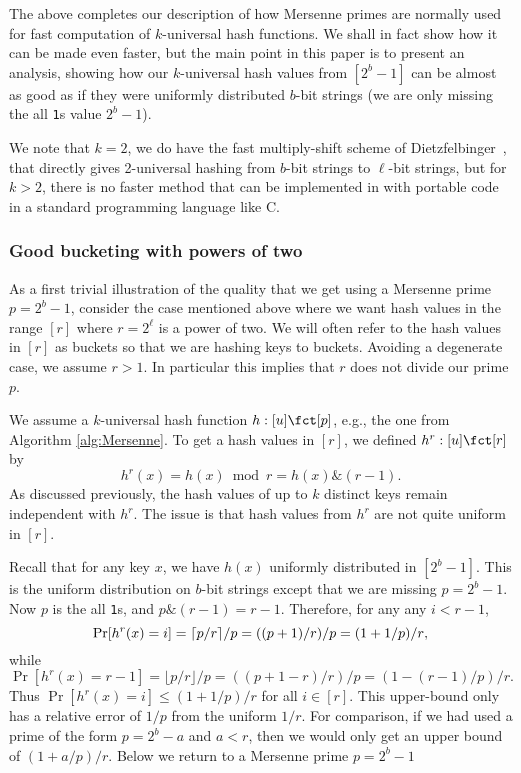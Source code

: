 The above completes our description of how Mersenne primes are
normally used for fast computation of $k$-universal hash functions.
We shall in fact show how it can be made even faster, but the main
point in this paper is to present an analysis, showing how our
$k$-universal hash values from $[2^b-1]$ can be almost as good as if
they were uniformly distributed $b$-bit strings (we are only missing
the all \texttt{1}s value $2^b-1$). 

We note that $k=2$, we do have the fast multiply-shift scheme of Dietzfelbinger~\cite{dietzfel96universal}, that directly gives 2-universal
hashing from $b$-bit strings to $\ell$-bit strings, but for $k>2$,
there is no faster method that can be implemented in with portable code
in a standard programming language like C.




\subsubsection{Good bucketing with powers of two}\label{sec:power-of-two}
As a first trivial illustration of the quality that we get using a
Mersenne prime $p=2^b-1$, consider the case mentioned above where we
want hash values in the range $[r]$ where $r=2^\ell$ is a power of
two. We will often refer to the hash values in $[r]$ as buckets so
that we are hashing keys to buckets. Avoiding a degenerate case, we
assume $r>1$. In particular this implies that $r$ does not divide our
prime $p$.

We assume a $k$-universal hash function $h:[u]\fct[p]$, e.g.,
the one from Algorithm \ref{alg:Mersenne}. To get a hash values in $[r]$,
we defined $h^r:[u]\fct[r]$ by
\[h^r(x)=h(x)\bmod r=h(x)\texttt \& (r-1).\]
As discussed previously, the hash values of up to $k$ distinct keys remain
independent with $h^r$. The issue is that hash values from 
$h^r$ are not quite uniform in $[r]$.

Recall that for any key $x$, we have $h(x)$ uniformly distributed in $[2^b-1]$.
This is the uniform distribution on $b$-bit strings except that we are
missing $p=2^b-1$. Now $p$ is the all \texttt{1}s, and 
$p\texttt \& (r-1)=r-1$. Therefore, for any 
any $i<r-1$,
\begin{equation}\label{eq:coll-ell<r-1}
\Pr[h^r(x)=i]=\lceil p/r\rceil/p=((p+1)/r)/p
=(1+1/p)/r\textnormal,
\end{equation}
while 
\begin{equation}\label{eq:coll-ell=r-1}
 \Pr[h^r(x)=r-1]=\lfloor p/r\rfloor/p=((p+1-r)/r)/p
=(1-(r-1)/p)/r.
\end{equation}
Thus $\Pr[h^r(x)=i]\leq (1+1/p)/r$ for all $i\in[r]$. This upper-bound
only has a relative error of $1/p$ from the uniform $1/r$. For
comparison, if we had used a prime of the form $p=2^b-a$ and $a<r$, then
we would only get an upper bound of $(1+a/p)/r$. Below we return
to a Mersenne prime $p=2^b-1$

